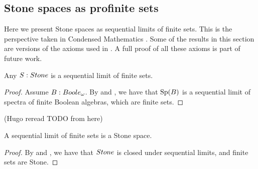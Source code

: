 
\subsection{Stone spaces as profinite sets}
Here we present Stone spaces as sequential limits of finite sets. 
This is the perspective taken in Condensed Mathematics \cite{Condensed,Dagur,Scholze}.
Some of the results in this section are versions of the axioms used in 
\cite{bc24}. A full proof of all these axioms is part of future work. 

\begin{lemma}
  Any $S:\Stone$ is a sequential limit of finite sets. 
\end{lemma}
\begin{proof}
  Assume $B:\Boole$. By  and , %
 we have that $\operatorname{Sp}(B)$ is a sequential limit of spectra of finite Boolean algebras, which are finite sets. 
\end{proof}

(Hugo reread TODO from here)

\begin{lemma}\label{StoneAreProfinite} 
  A sequential limit of finite sets is a Stone space. 
\end{lemma}
\begin{proof}
  By  and %
  , 
  we have that $\Stone$ is closed under sequential limits, and finite sets are Stone.
\end{proof}

